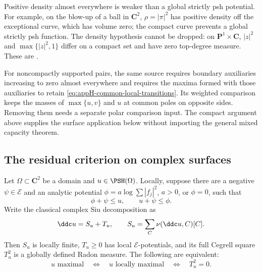 Positive density almost everywhere is weaker than a global strictly
psh potential. For example, on the blow-up of a ball in \(\mathbf C^2\),
\(\rho=|\pi|^2\) has positive density off the exceptional curve,
which has volume zero; the compact curve prevents a global strictly
psh function. The density hypothesis cannot be dropped: on
\(\mathbf P^1\times\mathbf C\), \(|z|^2\) and
\(\max\{|z|^2,1\}\) differ on a compact set and have zero
top-degree measure. These are
\cite[Example~4.6 and the following discussion]{DoHiep26LocalComparisonV1}.

For noncompactly supported pairs, the same source requires boundary
auxiliaries increasing to zero almost everywhere and requires the
maxima formed with those auxiliaries to retain
\eqref{eq:appH-common-local-transitions}. Its weighted comparison
keeps the masses of \(\max\{u,v\}\) and \(u\) at common poles
on opposite sides. Removing them needs a separate polar comparison
input. The compact argument above supplies the surface application
below without importing the general mixed capacity theorem.

\subsection{The residual criterion on complex surfaces}
\label{sec:appH-surface-residual-maximality}

\begin{theorem}
\label{thm:appH-surface-residual-maximality}
Let \(\Omega\subset\mathbf C^2\) be a domain and
\(u\in\PSH(\Omega)\). Locally, suppose there are a negative
\(\psi\in\mathcal E\) and an analytic potential
\(\phi=a\log\sum|f_j|^2\), \(a>0\), or \(\phi=0\), such that
\[
 \phi+\psi\leq u,\qquad u+\psi\leq\phi.
 \tag{H.6}\label{eq:appH-surface-energy-sandwich}
\]
Write the classical complex Siu decomposition as
\[
 \ddc u=S_u+T_u,\qquad
 S_u=\sum_C\nu(\ddc u,C)[C].
\]
Then \(S_u\) is locally finite, \(T_u\geq0\) has local
\(\mathcal E\)-potentials,
and its full Cegrell square \(T_u^2\) is a globally defined
Radon measure. The following are equivalent:
\[
 u\text{ maximal}\quad\Longleftrightarrow\quad
 u\text{ locally maximal}\quad\Longleftrightarrow\quad T_u^2=0.
 \tag{H.7}\label{eq:appH-surface-residual-criterion}
\]
\end{theorem}

